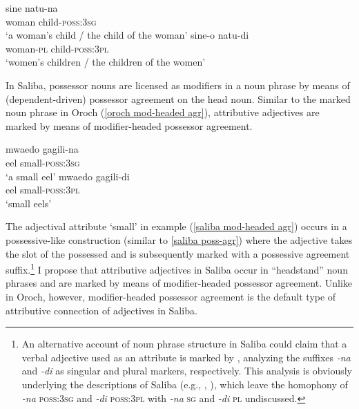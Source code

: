 \begin{exe}
\ex
\label{saliba poss-agr}
\begin{xlist}
\ex
\gll 	sine natu-na\\
 	woman child-\textsc{poss:3sg}\\
\glt ‘a woman's child / the child of the woman’
\ex
\gll 	sine-o natu-di\\
	woman-\textsc{pl} child-\textsc{poss:3pl}\\
\glt	‘women's children / the children of the women’%
\end{xlist}
\end{exe}
In Saliba, possessor nouns are licensed as modifiers in a noun phrase by means of (dependent\hyp{}driven) possessor agreement on the head noun. Similar to the marked noun phrase in Oroch (\ref{oroch mod-headed agr}), attributive adjectives are marked by means of modifier\hyp{}headed possessor agreement.


\newpage
\begin{exe}
\ex
\label{saliba mod-headed agr}
\begin{xlist}
\ex
\gll 	mwaedo gagili-na\\
 eel small-\textsc{poss:3sg}\\
\glt ‘a small eel’
\ex
\gll 	mwaedo gagili-di\\
	eel small-\textsc{poss:3pl}\\
\glt ‘small eels’
\end{xlist}
\end{exe}
The adjectival attribute ‘small’ in example (\ref{saliba mod-headed agr}) occurs in a possessive-like construction (similar to \ref{saliba poss-agr}) where the adjective takes the slot of the possessed and is subsequently marked with a possessive agreement suffix.\footnote{An alternative account of noun phrase structure in Saliba could claim that a verbal adjective used as an attribute is marked by , analyzing the suffixes \textit{-na} and \textit{-di} as singular and plural markers, respectively. This analysis is obviously underlying the descriptions of Saliba (e.g., \citealt{mosel1994}, \citealt{margetts1999}), which leave the homophony of \textit{-na} \textsc{poss:3sg} and \textit{-di} \textsc{poss:3pl} with \textit{-na} \textsc{sg} and \textit{-di} \textsc{pl} undiscussed.}  I propose that attributive adjectives in Saliba occur in “headstand” noun phrases and are marked by means of modifier\hyp{}headed possessor agreement. Unlike in Oroch, however, modifier\hyp{}headed possessor agreement is the default type of attributive connection of adjectives in Saliba.

